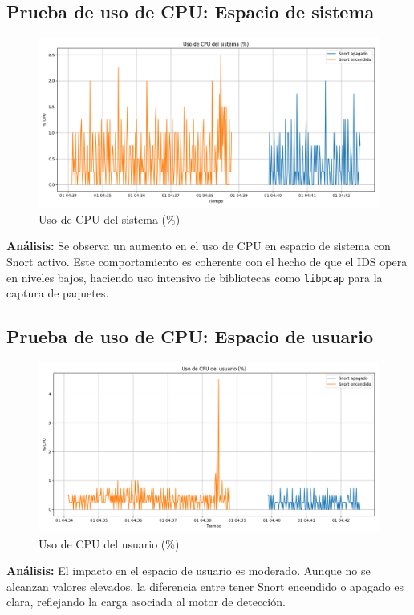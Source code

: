 \documentclass[11pt,a4paper,twoside]{report}
\begin{document}
\subsection*{Prueba de uso de CPU: Espacio de sistema}

\begin{figure}[H]
	\centering
	\includegraphics[width=\textwidth]{graficas/cpu_sys.png}
	\caption{Uso de CPU del sistema (\%)}
\end{figure}
\textbf{Análisis:} Se observa un aumento en el uso de CPU en espacio de sistema con Snort activo. Este comportamiento es coherente con el hecho de que el IDS opera en niveles bajos, haciendo uso intensivo de bibliotecas como \texttt{libpcap} para la captura de paquetes.

\subsection*{Prueba de uso de CPU: Espacio de usuario}

\begin{figure}[H]
	\centering
	\includegraphics[width=\textwidth]{graficas/cpu_usr.png}
	\caption{Uso de CPU del usuario (\%)}
\end{figure}
\textbf{Análisis:} El impacto en el espacio de usuario es moderado. Aunque no se alcanzan valores elevados, la diferencia entre tener Snort encendido o apagado es clara, reflejando la carga asociada al motor de detección.
\end{document}
